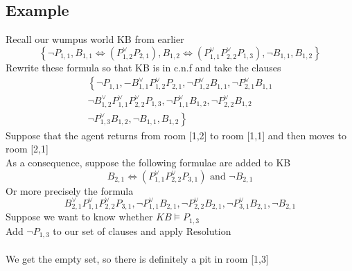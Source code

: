 \documentclass{article}[18pt]
\begin{document}
\subsection{Example}
Recall our wumpus world KB from earlier
\[
\left\{\neg P_{1,1}, B_{1,1} \Leftrightarrow\left(P_{1,2}^{\vee} P_{2,1}\right), B_{1,2} \Leftrightarrow\left(P_{1,1}^{\vee} P_{2,2}^{\vee} P_{1,3}\right), \neg B_{1,1}, B_{1,2}\right\}
\]
Rewrite these formula so that KB is in c.n.f and take the clauses
\[
\begin{array}{l}{\left\{\neg P_{1,1},-B_{1,1}^{\vee} P_{1,2}^{\vee} P_{2,1}, \neg P_{1,2}^{\vee} B_{1,1}, \neg P_{2,1}^{\vee} B_{1,1}\right.} \\ {\neg B_{1,2}^{\vee} P_{1,1}^{\vee} P_{2,2}^{\vee} P_{1,3}, \neg P_{1,1}^{\vee} B_{1,2}, \neg P_{2,2}^{\vee} B_{1,2}} \\ {\left.\neg P_{1,3}^{\vee} B_{1,2}, \neg B_{1,1}, B_{1,2}\right\}}\end{array}
\]
Suppose that the agent returns from room [1,2] to room [1,1] and then moves to room [2,1]\\
As a consequence, suppose the following formulae are added to KB
\[
B_{2,1} \Leftrightarrow\left(P_{1,1}^{\vee} P_{2,2}^{\vee} P_{3,1}\right) \text { and } \neg B_{2,1}
\]
Or more precisely the formula
\[
B_{2,1}^{\vee} P_{1,1}^{\vee} P_{2,2}^{\vee} P_{3,1}, \neg P_{1,1}^{\vee} B_{2,1}, \neg P_{2,2}^{\vee} B_{2,1}, \neg P_{3,1}^{\vee} B_{2,1}, \neg B_{2,1}
\]
Suppose we want to know whether $KB \models P_{1,3}$\\
Add $\lnot P_{1,3}$ to our set of clauses and apply Resolution\\
\\
We get the empty set, so there is definitely a pit in room [1,3]
\end{document}
